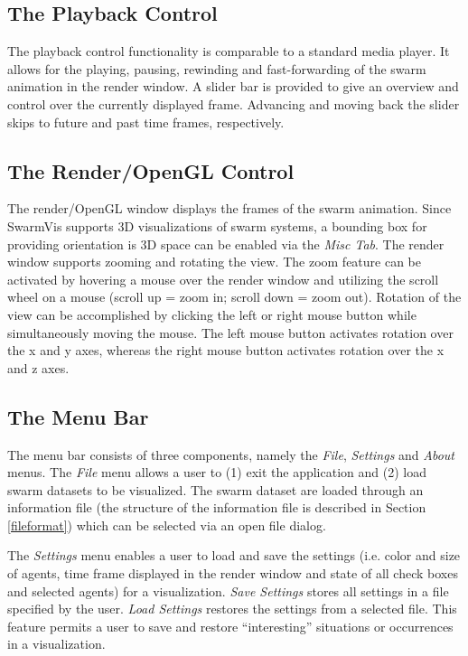 \documentclass{article}
\begin{document}
\subsection{The Playback Control}

The playback control functionality is comparable to a standard media player. It allows for the playing, pausing, rewinding and fast-forwarding of the swarm animation in the render window. A slider bar is provided to give an overview and control over the currently displayed frame. Advancing and moving back the slider skips to future and past time frames, respectively.

\subsection{The Render/OpenGL Control}

The render/OpenGL window displays the frames of the swarm animation. Since SwarmVis supports 3D visualizations of swarm systems, a bounding box for providing orientation is 3D space can be enabled via the \textit{Misc Tab}. The render window supports zooming and rotating the view. The zoom feature can be activated by hovering a mouse over the render window and utilizing the scroll wheel on a mouse (scroll up = zoom in; scroll down = zoom out). Rotation of the view can be accomplished by clicking the left or right mouse button while simultaneously moving the mouse. The left mouse button activates rotation over the x and y axes, whereas the right mouse button activates rotation over the x and z axes.

\subsection{The Menu Bar}

The menu bar consists of three components, namely the \textit{File}, \textit{Settings} and \textit{About} menus.
The \textit{File} menu allows a user to (1) exit the application and (2) load swarm datasets to be visualized. The swarm dataset are loaded through an information file (the structure of the information file is described in Section \ref{fileformat}) which can be selected via an open file dialog.

The \textit{Settings} menu enables a user to load and save the settings (i.e. color and size of agents, time frame displayed in the render window and state of all check boxes and selected agents) for a visualization. \textit{Save Settings} stores all settings in a file specified by the user. \textit{Load Settings} restores the settings from a selected file. This feature permits a user to save and restore ``interesting'' situations or occurrences in a visualization.
\end{document}
